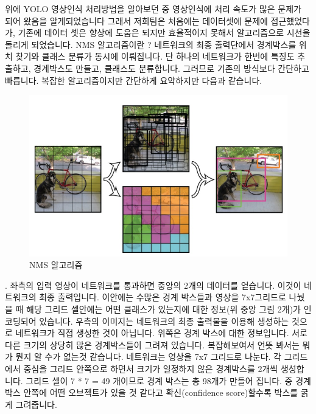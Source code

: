 \documentclass{article}
\begin{document}
위에 YOLO 영상인식 처리방법을 알아보던 중 영상인식에 처리 속도가 많은 문제가 되어 왔음을 알게되었습니다 그래서 저희팀은 처음에는 데이터셋에 문제에 접근했었다가, 기존에 데이터 셋은 향상에 도움은 되지만 효율적이지 못해서 알고리즘으로 시선을 돌리게 되었습니다.
\newline
\newline NMS 알고리즘이란 ?
\newline
\newline 네트워크의 최종 출력단에서 경계박스를 위치 찾기와 클래스 분류가 동시에 이뤄집니다.
단 하나의 네트워크가 한번에 특징도 추출하고, 경계박스도 만들고, 클래스도 분류합니다.  그러므로 기존의 방식보다 간단하고 빠릅니다.
복잡한 알고리즘이지만 간단하게 요약하지만 다음과 같습니다.

\begin{figure}[h!]
\centering
\includegraphics[scale=1.0]{enhanceyolo3.jpg}
\caption{ NMS 알고리즘 }
\label{fig:detect}
\end{figure}
.
\newline 좌측의 입력 영상이 네트워크를 통과하면 중앙의 2개의 데이터를 얻습니다.
이것이 네트워크의 최종 출력입니다.
이안에는 수많은 경계 박스들과 영상을 7x7그리드로 나눴을 때 해당 그리드 셀안에는 어떤 클래스가 있는지에 대한 정보(위 중앙 그림 2개)가 인코딩되어 있습니다.
우측의 이미지는 네트워크의 최종 출력물을 이용해 생성하는 것으로 네트워크가 직접 생성한 것이 아닙니다.
 위쪽은 경계 박스에 대한 정보입니다. 서로 다른 크기의 상당히 많은 경계박스들이 그려져 있습니다.
복잡해보여서 언뜻 봐서는 뭐가 뭔지 알 수가 없는것 같습니다.
네트워크는 영상을 7x7 그리드로 나눈다. 각 그리드에서 중심을 그리드 안쪽으로 하면서 크기가 일정하지 않은 경계박스를 2개씩 생성합니다.
그리드 셀이 7 * 7 = 49 개이므로 경계 박스는 총 98개가 만들어 집니다.
 중 경계 박스 안쪽에 어떤 오브젝트가 있을 것 같다고 확신(confidence score)할수록 박스를 굵게 그려줍니다.
\end{document}
